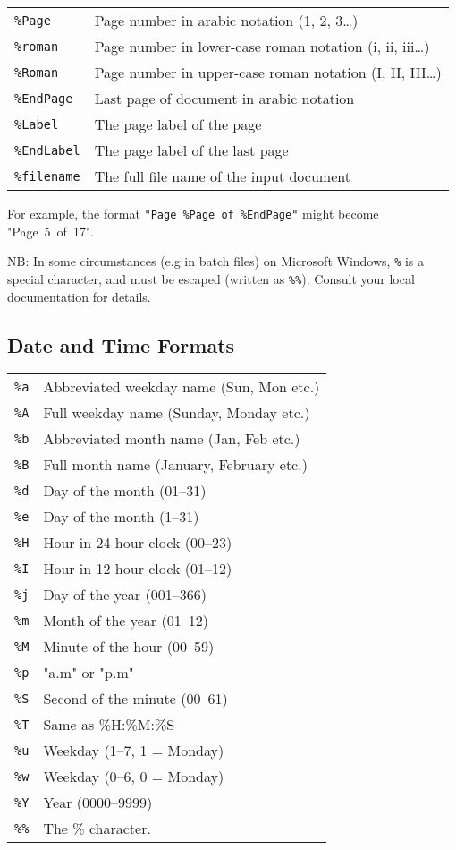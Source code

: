 \documentclass{book}
\begin{document}
  \vspace{2mm}
  \begin{tabular}{ll}
    \texttt{\%Page} & Page number in arabic notation (1, 2, 3\ldots) \\
    \texttt{\%roman} & Page number in lower-case roman notation (i, ii, iii\ldots) \\
    \texttt{\%Roman} & Page number in upper-case roman notation (I, II, III\ldots) \\
    \texttt{\%EndPage} & Last page of document in arabic notation \\
    \texttt{\%Label} & The page label of the page \\
    \texttt{\%EndLabel} & The page label of the last page \\
    \texttt{\%filename} & The full file name of the input document \\
  \end{tabular}

  \vspace{2mm}
  \noindent For example, the format \texttt{"Page~\%Page~of~\%EndPage"} might become "Page~5~of~17".

  NB: In some circumstances (e.g in batch files) on Microsoft Windows, \verb!%! is a special character, and must be escaped (written as \verb$%%$). Consult your local documentation for details.

  \subsection{Date and Time Formats}
  \begin{tabular}{ll}
    \texttt{\%a} & Abbreviated weekday name (Sun, Mon etc.)\\
    \texttt{\%A} & Full weekday name (Sunday, Monday etc.)\\
    \texttt{\%b} & Abbreviated month name (Jan, Feb etc.)\\
    \texttt{\%B} & Full month name (January, February etc.)\\
    \texttt{\%d} & Day of the month (01--31) \\
    \texttt{\%e} & Day of the month (1--31) \\
    \texttt{\%H} & Hour in 24-hour clock (00--23)\\
    \texttt{\%I} & Hour in 12-hour clock (01--12)\\
    \texttt{\%j} & Day of the year (001--366)\\
    \texttt{\%m} & Month of the year (01--12)\\
    \texttt{\%M} & Minute of the hour (00--59)\\
    \texttt{\%p} & "a.m" or "p.m"\\
    \texttt{\%S} & Second of the minute (00--61)\\
    \texttt{\%T} & Same as \%H:\%M:\%S\\
    \texttt{\%u} & Weekday (1--7, 1 = Monday)\\
    \texttt{\%w} & Weekday (0--6, 0 = Monday)\\
    \texttt{\%Y} & Year (0000--9999)\\
    \texttt{\%\%} & The \% character.
  \end{tabular}
\end{document}
